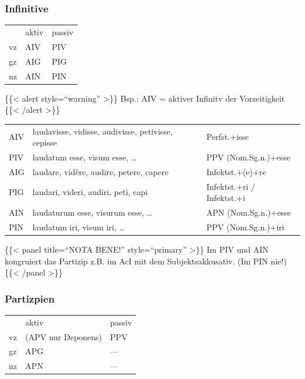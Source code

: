 \documentclass{scrartcl}
\begin{document}
\subsubsection{Infinitive}
\label{sec:orgbe42246}

\begin{center}
\begin{tabular}{lll}
 & aktiv & passiv\\
vz & AIV & PIV\\
gz & AIG & PIG\\
nz & AIN & PIN\\
\end{tabular}
\end{center}


\{\{< alert style="`warning"' >\}\} Bsp.: AIV = aktiver Infinitv der Vorzeitigkeit \{\{< /alert >\}\}


\begin{center}
\begin{tabular}{lll}
AIV & laudavisse, vidisse, audivisse, petivisse, cepisse & Perfst.+isse\\
PIV & laudatum esse, visum esse, \ldots{} & PPV (Nom.Sg.n.)+esse\\
AIG & laudare, vidêre, audire, petere, capere & Infektst.+(e)+re\\
PIG & laudari, videri, audiri, peti, capi & Infektst.+ri / Infektst.+i\\
AIN & laudaturum esse, visurum esse, \ldots{} & APN (Nom.Sg.n.)+esse\\
PIN & laudatum iri, visum iri, \ldots{} & PPV (Nom.Sg.n.)+iri\\
\end{tabular}
\end{center}


\{\{< panel title="`NOTA BENE!"' style="`primary"' >\}\} Im PIV und AIN kongruiert das Partizip z.B. im AcI mit dem Subjektsakkusativ. (Im PIN nie!) \{\{< /panel >\}\}



\subsubsection{Partizpien}
\label{sec:orgece3055}

\begin{center}
\begin{tabular}{lll}
 & aktiv & passiv\\
vz & (APV nur Deponens) & PPV\\
gz & APG & ---\\
nz & APN & ---\\
\end{tabular}
\end{center}
\end{document}
